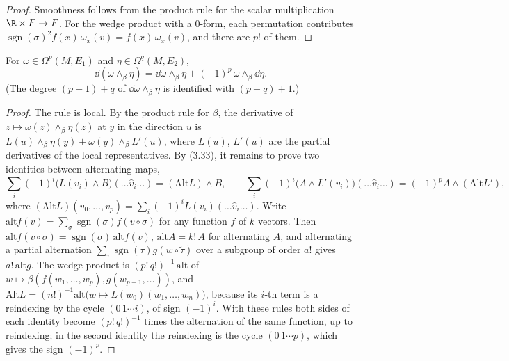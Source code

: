 \begin{proof}
  \leanok
  Smoothness follows from the product rule for the scalar multiplication $\R \times F \to F$.
  For the wedge product with a $0$-form, each permutation contributes $\operatorname{sgn}(\sigma)^2
  f(x)\,\omega_x(v) = f(x)\,\omega_x(v)$, and there are $p!$ of them.
\end{proof}

\begin{theorem}
  \label{thm:wedge-leibniz}
  \leanok
  For $\omega \in \Omega^p(M, E_1)$ and $\eta \in \Omega^q(M, E_2)$,
  \[
    \dd(\omega \wedge_\beta \eta) = \dd\omega \wedge_\beta \eta + (-1)^p\, \omega \wedge_\beta
    \dd\eta.
  \]
  (The degree $(p + 1) + q$ of $\dd\omega \wedge_\beta \eta$ is identified with $(p + q) + 1$.)
\end{theorem}

\begin{proof}
  \leanok
  The rule is local. By the product rule for $\beta$, the derivative of $z \mapsto
  \omega(z) \wedge_\beta \eta(z)$ at $y$ in the direction $u$ is $L(u) \wedge_\beta \eta(y) +
  \omega(y) \wedge_\beta L'(u)$, where $L(u)$, $L'(u)$ are the partial derivatives of the local
  representatives. By (3.33), it remains to prove two identities between alternating maps,
  \[
    \sum_i (-1)^i \bigl(L(v_i) \wedge B\bigr)(\dots \hat v_i \dots) = (\mathrm{Alt}L)
    \wedge B, \qquad \sum_i (-1)^i \bigl(A \wedge L'(v_i)\bigr)(\dots \hat v_i \dots) =
    (-1)^p A \wedge (\mathrm{Alt} L'),
  \]
  where $(\mathrm{Alt}L)(v_0, \dots, v_p) = \sum_i (-1)^i L(v_i)(\dots \hat v_i \dots)$. Write
  $\mathrm{alt}f(v) = \sum_\sigma \operatorname{sgn}(\sigma) f(v \circ \sigma)$ for any function $f$
  of $k$ vectors. Then $\mathrm{alt} f(v \circ \sigma) = \operatorname{sgn}(\sigma)\,
  \mathrm{alt}f(v)$, $\mathrm{alt} A = k!\, A$ for alternating $A$, and alternating a partial
  alternation $\sum_\tau \operatorname{sgn}(\tau) g(w \circ \tilde\tau)$ over a subgroup of
  order $a!$ gives $a!\, \mathrm{alt}g$. The wedge product is $(p!\,q!)^{-1}\,\mathrm{alt}$ of
  $w \mapsto \beta(f(w_1, \dots, w_p), g(w_{p+1}, \dots))$, and $\mathrm{Alt} L = (n!)^{-1}
  \mathrm{alt}\bigl(w \mapsto L(w_0)(w_1, \dots, w_n)\bigr)$, because its $i$-th term is a
  reindexing by the cycle $(0\,1 \cdots i)$, of sign $(-1)^i$. With these rules both sides of each
  identity become $(p!\,q!)^{-1}$ times the alternation of the same function, up to reindexing; in
  the second identity the reindexing is the cycle $(0\,1 \cdots p)$, which gives the sign $(-1)^p$.
\end{proof}

